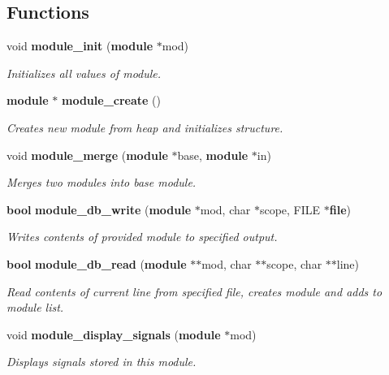 \subsection*{Functions}
\begin{CompactItemize}
\item 
void {\bf module\_\-init} ({\bf module} $\ast$mod)
\begin{CompactList}\small\item\em Initializes all values of module.\item\end{CompactList}\item 
{\bf module} $\ast$ {\bf module\_\-create} ()
\begin{CompactList}\small\item\em Creates new module from heap and initializes structure.\item\end{CompactList}\item 
void {\bf module\_\-merge} ({\bf module} $\ast$base, {\bf module} $\ast$in)
\begin{CompactList}\small\item\em Merges two modules into base module.\item\end{CompactList}\item 
{\bf bool} {\bf module\_\-db\_\-write} ({\bf module} $\ast$mod, char $\ast$scope, FILE $\ast${\bf file})
\begin{CompactList}\small\item\em Writes contents of provided module to specified output.\item\end{CompactList}\item 
{\bf bool} {\bf module\_\-db\_\-read} ({\bf module} $\ast$$\ast$mod, char $\ast$$\ast$scope, char $\ast$$\ast$line)
\begin{CompactList}\small\item\em Read contents of current line from specified file, creates module and adds to module list.\item\end{CompactList}\item 
void {\bf module\_\-display\_\-signals} ({\bf module} $\ast$mod)
\begin{CompactList}\small\item\em Displays signals stored in this module.\item\end{CompactList}\item 
$$
\end{CompactItemize}
